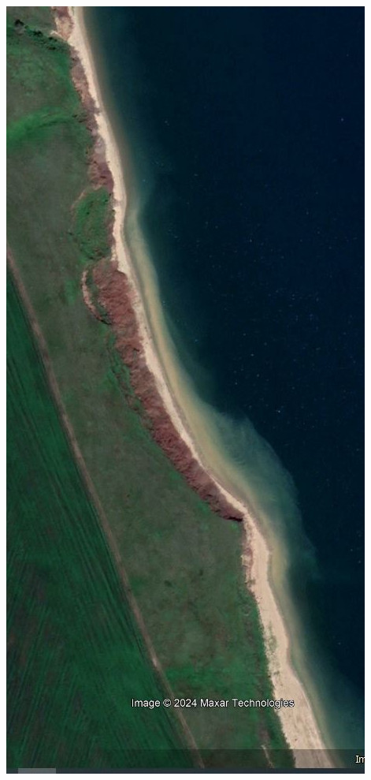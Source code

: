 \documentclass[10pt]{beamer}
\begin{document}
\begin{frame}
\begin{columns}
\begin{column}{0.25\linewidth}
    \end{column}
    \begin{column}{0.25\linewidth}
      \includegraphics[width=1\linewidth]{source-img-ge.jpeg}

\end{column}
\end{columns}
\end{frame}
\end{document}
